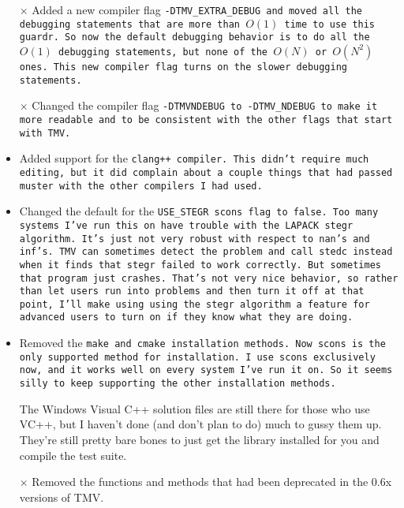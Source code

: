 \begin{itemize}
\item[$\times$]
Added a new compiler flag \tt{-DTMV\_EXTRA\_DEBUG} and moved all the debugging statements that are more than $O(1)$ time to use this guardr.  So now the default debugging behavior is to do all the $O(1)$ debugging statements, but none of the $O(N)$ or $O(N^2)$ ones.  This new compiler flag turns on the slower debugging statements.

\item[$\times$]
Changed the compiler flag \tt{-DTMVNDEBUG} to \tt{-DTMV\_NDEBUG} to make it more readable and to be consistent with the other flags that start with TMV.

\item 
Added support for the \tt{clang++} compiler.  This didn't require much editing, but it did complain about a couple things that had passed muster with the other compilers I had used.

\item
Changed the default for the \tt{USE\_STEGR} \tt{scons} flag to false.  Too many
systems I've run this on have trouble with the LAPACK \tt{stegr} algorithm.
It's just not very robust with respect to \tt{nan}'s and \tt{inf}'s.  TMV can
sometimes detect the problem and call \tt{stedc} instead when it finds 
that \tt{stegr} failed to work correctly.  But sometimes that program just
crashes.  That's not very nice behavior, so rather than let users run 
into problems and then turn it off at that point, I'll make using 
using the \tt{stegr} algorithm a feature for advanced users to turn on if 
they know what they are doing.

\item
Removed the \tt{make} and \tt{cmake} installation methods.  
Now \tt{scons} is the 
only supported method for installation.  I use \tt{scons} exclusively now, 
and it works well on every system I've run it on.  So it seems silly
to keep supporting the other installation methods.  

The Windows Visual C++ solution files are still there for those who use VC++,
but I haven't done (and don't plan to do) much to gussy them up.  They're
still pretty bare bones to just get the library installed for you and
compile the test suite.

\item[$\times$]
Removed the functions and methods that had been deprecated in the 0.6x
versions of TMV.


\end{itemize}
